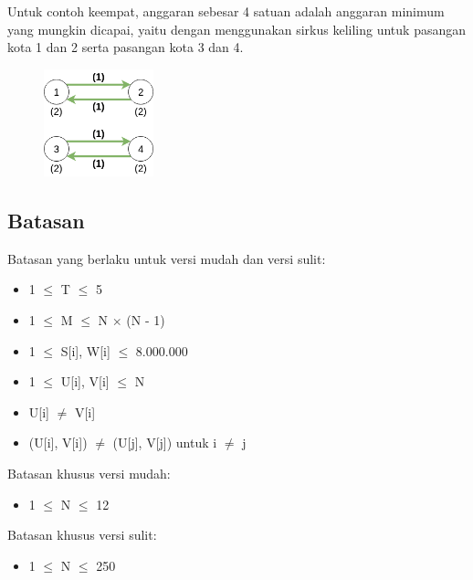 \documentclass[../main_problemset.tex]{subfiles} %
\begin{document}
Untuk contoh keempat, anggaran sebesar 4 satuan adalah anggaran minimum yang mungkin dicapai, yaitu dengan menggunakan sirkus keliling untuk pasangan kota 1 dan 2 serta pasangan kota 3 dan 4.

\begin{figure}[H]
	\centering
	\includegraphics[width=120px]{bis-ddak/asset/Sample_4_OK}
\end{figure}

\subsection*{Batasan}

\begin{minipage}[t]{0.47\textwidth}
	
Batasan yang berlaku untuk versi mudah dan versi sulit:

\begin{itemize}
	\item 1 $ \leq $ T $ \leq $ 5
	\item 1 $ \leq $ M $ \leq $ N $ \times $ (N - 1)
	\item 1 $ \le $ S[i], W[i] $ \le $ 8.000.000
	\item 1 $ \le $ U[i], V[i] $ \le $ N
	\item U[i] $ \neq $ V[i]
	\item (U[i], V[i]) $ \neq $ (U[j], V[j]) untuk i $ \neq $ j
\end{itemize}
\end{minipage}
\begin{minipage}[t]{0.06\textwidth}
	\hfill
\end{minipage}
\begin{minipage}[t]{0.47\textwidth}
	Batasan khusus versi mudah:
	\begin{itemize}
		\item 1 $ \le $ N $ \le $ 12
	\end{itemize}
	
	\vspace{.2cm}
	
	Batasan khusus versi sulit:
	\begin{itemize}
		\item 1 $ \le $ N $ \le $ 250
	\end{itemize}
\end{minipage}
\end{document}
